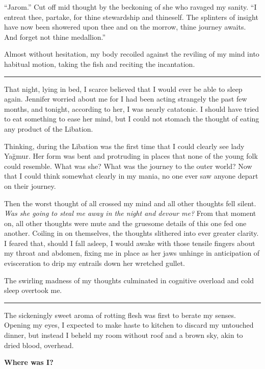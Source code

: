 \documentclass[11pt]{memoir}
\begin{document}
``Jarom.'' Cut off mid thought by the beckoning of she who ravaged my sanity. ``I entreat thee, partake, for thine stewardship and thineself. The splinters of insight have now been showered upon thee and on the morrow, thine journey awaits. And forget not thine medallion.''

Almost without hesitation, my body recoiled against the reviling of my mind into habitual motion, taking the fish and reciting the incantation.

\noindent\rule{\textwidth}{1pt}

That night, lying in bed, I scarce believed that I would ever be able to sleep again. Jennifer worried about me for I had been acting strangely the past few months, and tonight, according to her, I was nearly catatonic. I should have tried to eat something to ease her mind, but I could not stomach the thought of eating any product of the Libation.

Thinking, during the Libation was the first time that I could clearly see lady Yağmur. Her form was bent and protruding in places that none of the young folk could resemble. What was she? What was the journey to the outer world? Now that I could think somewhat clearly in my mania, no one ever saw anyone depart on their journey.

Then the worst thought of all crossed my mind and all other thoughts fell silent. \textit{Was she going to steal me away in the night and devour me?} From that moment on, all other thoughts were mute and the gruesome details of this one fed one another. Coiling in on themselves, the thoughts slithered into ever greater clarity. I feared that, should I fall asleep, I would awake with those tensile fingers about my throat and abdomen, fixing me in place as her jaws unhinge in anticipation of evisceration to drip my entrails down her wretched gullet.

The swirling madness of my thoughts culminated in cognitive overload and cold sleep overtook me.

\noindent\rule{\textwidth}{1pt}

The sickeningly sweet aroma of rotting flesh was first to berate my senses. Opening my eyes, I expected to make haste to kitchen to discard my untouched dinner, but instead I beheld my room without roof and a brown sky, akin to dried blood, overhead.

\vspace{5mm}
\textbf{Where was I?}
\vspace{5mm}
\end{document}
